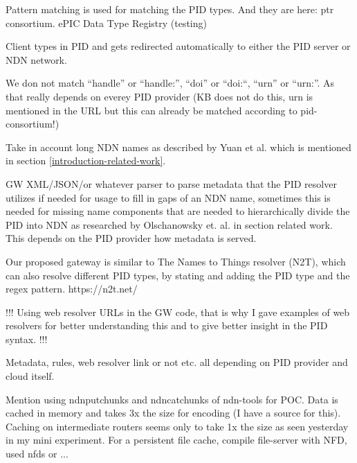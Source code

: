 Pattern matching is used for matching the PID types. And they are here: ptr consortium.
ePIC Data Type Registry (testing)

Client types in PID and gets redirected automatically to either the PID server or NDN network.

We don not match “handle” or “handle:”, “doi” or “doi:“, “urn” or “urn:”. As that really depends on everey PID provider (KB does not do this, urn is mentioned in the URL but this can already be matched according to pid-consortium!) 

Take in account long NDN names as described by Yuan et al. \cite{yuan2012scalable} which is mentioned in section \ref{introduction-related-work}.

GW XML/JSON/or whatever parser to parse metadata that the PID resolver utilizes if needed for usage to fill in gaps of an NDN name, sometimes this is needed for missing name components that are needed to hierarchically divide the PID into NDN as researched by Olschanowsky et. al. in section related work. 
This depends on the PID provider how metadata is served.

Our proposed gateway is similar to The Names to Things resolver (N2T), which can also resolve different PID types, by stating and adding the PID type and the regex pattern. https://n2t.net/

!!! Using web resolver URLs in the GW code, that is why I gave examples of web resolvers for better understanding this and to give better insight in the PID syntax. !!!

Metadata, rules, web resolver link or not etc. all depending on PID provider and cloud itself.

Mention using ndnputchunks and ndncatchunks of ndn-tools for POC. Data is cached in memory and takes 3x the size for encoding (I have a source for this). Caching on intermediate routers seems only to take 1x the size as seen yesterday in my mini experiment. For a persistent file cache, compile file-server with NFD, used nfds or ...
